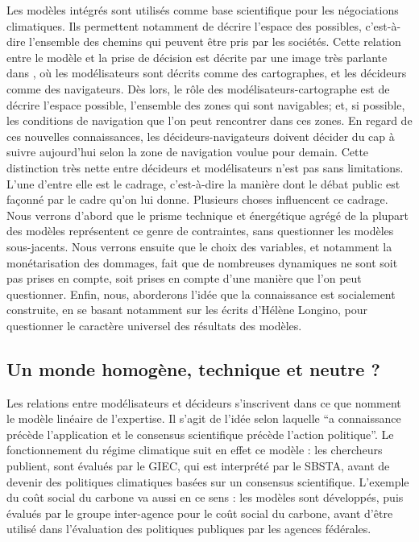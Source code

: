Les modèles intégrés sont utilisés comme base scientifique pour les négociations climatiques. Ils permettent notamment de décrire l'espace des possibles, c'est-à-dire l'ensemble des chemins qui peuvent être pris par les sociétés. Cette relation entre le modèle et la prise de décision est décrite par une image très parlante dans \textcite{edenhofer_mapmakers_2014}, où les modélisateurs sont décrits comme des cartographes, et les décideurs comme des navigateurs. Dès lors, le rôle des modélisateurs-cartographe est de décrire l'espace possible, l'ensemble des zones qui sont navigables; et, si possible, les conditions de navigation que l'on peut rencontrer dans ces zones.  En regard de ces nouvelles connaissances, les décideurs-navigateurs doivent décider du cap à suivre aujourd'hui selon la zone de navigation voulue pour demain. Cette distinction très nette entre décideurs et modélisateurs n'est pas sans limitations. L'une d'entre elle est le cadrage, c'est-à-dire la manière dont le débat public est façonné par le cadre qu'on lui donne.  Plusieurs choses influencent ce cadrage. Nous verrons d'abord que le prisme technique et énergétique agrégé de la plupart des modèles représentent ce genre de contraintes, sans questionner les modèles sous-jacents. Nous verrons ensuite que le choix des variables, et notamment la monétarisation des dommages, fait que de nombreuses dynamiques ne sont soit pas prises en compte, soit prises en compte d'une manière que l'on peut questionner. Enfin, nous, aborderons l'idée que la connaissance est socialement construite, en se basant notamment sur les écrits d'Hélène Longino, pour questionner le caractère universel des résultats des modèles. 

\subsection{Un monde homogène, technique et neutre ?}
\label{ss:model-lineaire}

Les relations entre modélisateurs et décideurs s'inscrivent dans ce que \textcite{aykut_gouverner_nodate} nomment le modèle linéaire de l'expertise. Il s'agit de l'idée selon laquelle \enquote{a connaissance précède l’application et le consensus scientifique précède l’action politique}. Le fonctionnement du régime climatique suit en effet ce modèle : les chercheurs publient, sont évalués par le GIEC, qui est interprété par le SBSTA, avant de devenir des politiques climatiques basées sur un consensus scientifique. L'exemple du coût social du carbone va aussi en ce sens : les modèles sont développés, puis évalués par le groupe inter-agence pour le coût social du carbone, avant d'être utilisé dans l'évaluation des politiques publiques par les agences fédérales. 

